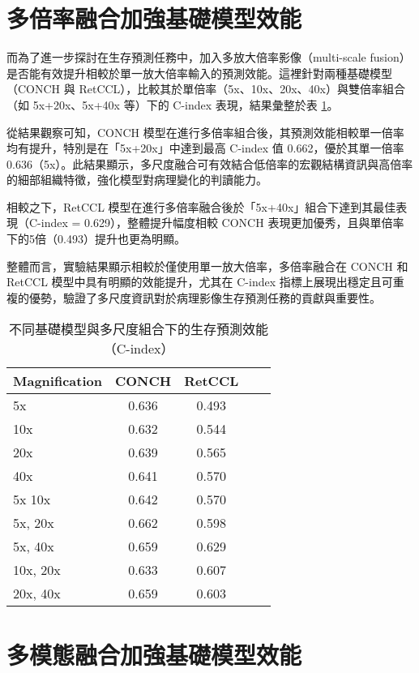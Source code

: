 \section{多倍率融合加強基礎模型效能}

而為了進一步探討在生存預測任務中，加入多放大倍率影像（multi-scale fusion）是否能有效提升相較於單一放大倍率輸入的預測效能。這裡針對兩種基礎模型（CONCH 與 RetCCL），比較其於單倍率（5x、10x、20x、40x）與雙倍率組合（如 5x+20x、5x+40x 等）下的 C-index 表現，結果彙整於表 \ref{tab:multi_scale_comparison}。

從結果觀察可知，CONCH 模型在進行多倍率組合後，其預測效能相較單一倍率均有提升，特別是在「5x+20x」中達到最高 C-index 值 0.662，優於其單一倍率 0.636（5x）。此結果顯示，多尺度融合可有效結合低倍率的宏觀結構資訊與高倍率的細部組織特徵，強化模型對病理變化的判讀能力。

相較之下，RetCCL 模型在進行多倍率融合後於「5x+40x」組合下達到其最佳表現（C-index = 0.629），整體提升幅度相較 CONCH 表現更加優秀，且與單倍率下的5倍（0.493）提升也更為明顯。

整體而言，實驗結果顯示相較於僅使用單一放大倍率，多倍率融合在 CONCH 和 RetCCL 模型中具有明顯的效能提升，尤其在 C-index 指標上展現出穩定且可重複的優勢，驗證了多尺度資訊對於病理影像生存預測任務的貢獻與重要性。

\begin{table}[ht]
\centering
\begin{tabular}{lcccc}
\hline
\textbf{Magnification} & \textbf{CONCH} & \textbf{RetCCL} \\
\hline
5x & 0.636 & 0.493 \\
10x & 0.632 & 0.544 \\
20x & 0.639 & 0.565 \\
40x & 0.641 & 0.570 \\
5x 10x & 0.642 & 0.570 \\
5x, 20x & 0.662 & 0.598 \\
5x, 40x & 0.659 & 0.629 \\
10x, 20x & 0.633 & 0.607 \\
20x, 40x & 0.659 & 0.603 \\
\hline
\end{tabular}
\caption{不同基礎模型與多尺度組合下的生存預測效能（C-index）}
\label{tab:multi_scale_comparison}
\end{table}


\section{多模態融合加強基礎模型效能}

